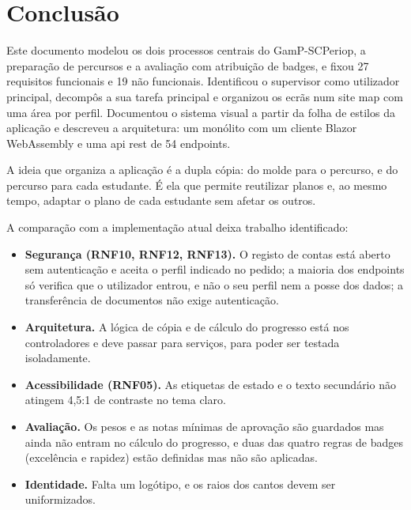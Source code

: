 \chapter{Conclusão}
\label{cap:conclusao}

Este documento modelou os dois processos centrais do GamP-SCPeriop, a preparação de percursos e a avaliação com atribuição de badges, e fixou 27 requisitos funcionais e 19 não funcionais. Identificou o supervisor como utilizador principal, decompôs a sua tarefa principal e organizou os ecrãs num site map com uma área por perfil. Documentou o sistema visual a partir da folha de estilos da aplicação e descreveu a arquitetura: um monólito com um cliente Blazor WebAssembly e uma \gls{api} \gls{rest} de 54 endpoints.

A ideia que organiza a aplicação é a dupla cópia: do molde para o percurso, e do percurso para cada estudante. É ela que permite reutilizar planos e, ao mesmo tempo, adaptar o plano de cada estudante sem afetar os outros.

A comparação com a implementação atual deixa trabalho identificado:

\begin{itemize}
    \item \textbf{Segurança (RNF10, RNF12, RNF13).} O registo de contas está aberto sem autenticação e aceita o perfil indicado no pedido; a maioria dos endpoints só verifica que o utilizador entrou, e não o seu perfil nem a posse dos dados; a transferência de documentos não exige autenticação.
    \item \textbf{Arquitetura.} A lógica de cópia e de cálculo do progresso está nos controladores e deve passar para serviços, para poder ser testada isoladamente.
    \item \textbf{Acessibilidade (RNF05).} As etiquetas de estado e o texto secundário não atingem 4,5:1 de contraste no tema claro.
    \item \textbf{Avaliação.} Os pesos e as notas mínimas de aprovação são guardados mas ainda não entram no cálculo do progresso, e duas das quatro regras de badges (excelência e rapidez) estão definidas mas não são aplicadas.
    \item \textbf{Identidade.} Falta um logótipo, e os raios dos cantos devem ser uniformizados.
\end{itemize}
